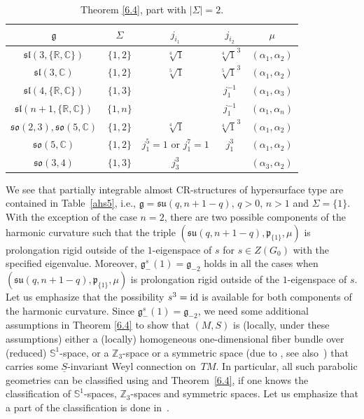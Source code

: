\documentclass[pdftex]{sigma}
\newcommand{\Si}{\Sigma}
\newcommand{\un}{\underline}
\newcommand{\fg}{\mathfrak g}
\newcommand{\fp}{\mathfrak p}
\newcommand{\id}{{\rm id}}
\newcommand{\R}{\mathbb{R}}
\newcommand{\C}{\mathbb{C}}
\numberwithin{equation}{section}
\begin{document}
\begin{table}[th!]\centering\caption{Theorem \ref{6.4}, part with $|\Si|=2$.}\label{ahs6}\vspace{1mm}

\begin{tabular}{|c|c|c|c|c|}
\hline
$\fg$ & $\Sigma$ & $j_{i_1}$& $j_{i_2}$& $\mu$ \\
\hline
\hline
$\mathfrak{sl}(3,\{\R,\C\})$ & $\{1,2\}$ & $\sqrt[4]{1}$ & $\sqrt[4]{1}^{3}$& $(\alpha_1,\alpha_2)$ \\
\hline
$\mathfrak{sl}(3,\C)$ & $\{1,2\}$ & $\sqrt[5]{1}$& $\sqrt[5]{1}^{3}$& $(\alpha_1,\alpha_2)$ \\
\hline
$\mathfrak{sl}(4,\{\R,\C\})$ & $\{1,3\}$ & & $j_1^{-1}$& $(\alpha_1,\alpha_3)$ \\
\hline
$\mathfrak{sl}(n+1,\{\R,\C\})$ & $\{1,n\}$ & & $j_1^{-1}$& $(\alpha_1,\alpha_n)$ \\
\hline
$\mathfrak{so}(2,3), \mathfrak{so}(5,\mathbb{C})$ & $\{1,2\}$&$\sqrt[4]{1}$ & $\sqrt[4]{1}^{3}$&$(\alpha_{1},\alpha_2)$\\
\hline
$\mathfrak{so}(5,\mathbb{C})$ & $\{1,2\}$&$j_1^5= 1$ or $j_1^7= 1$&$j_1^3$&$(\alpha_{1},\alpha_2)$\\
\hline
$\mathfrak{so}(3,4)$&$\{ 1,3\}$&$j_3^3$&& $(\alpha_3,\alpha_2)$ \\
\hline
\end{tabular}
\end{table}

\begin{Example}We see that partially integrable almost CR-structures of hypersurface type are contained in Table~\ref{ahs5}, i.e., $\fg=\mathfrak{su}(q,n+1-q)$, $q>0$, $n>1$ and $\Sigma=\{1\}$. With the exception of the case $n=2$, there are two possible components of the harmonic curvature such that the triple $(\mathfrak{su}(q,n+1-q),\fp_{\{1\}},\mu)$ is prolongation rigid outside of the $1$-eigenspace of $s$ for $s\in Z(G_0)$ with the specif\/ied eigenvalue. Moreover, $\fg_-^s(1)=\fg_{-2}$ holds in all the cases when $(\mathfrak{su}(q,n+1-q),\fp_{\{1\}},\mu)$ is prolongation rigid outside of the $1$-eigenspace of $s$. Let us emphasize that the possibility $s^3=\id$ is available for both components of the harmonic curvature. Since $\fg_-^s(1)=\fg_{-2}$, we need some additional assumptions in Theorem \ref{6.4} to show that $(M,S)$ is (locally, under these assumptions) either a (locally) homogeneous one-dimensional f\/iber bundle over (reduced) $\mathbb{S}^1$-space, or a $\mathbb{Z}_3$-space or a symmetric space (due to \cite[Proposition~7.3]{GZ3}, see also~\cite{Loos2}) that carries some $\un S$-invariant Weyl connection on~$TM$. In particular, all such parabolic geometries can be classif\/ied using \cite[Theorem~5.1.4]{disertace} and Theorem~\ref{6.4}, if one knows the classif\/ication of $\mathbb{S}^1$-spaces, $\mathbb{Z}_3$-spaces and symmetric spaces. Let us emphasize that a part of the classif\/ication is done in~\cite{G2}.
\end{Example}
\end{document}
